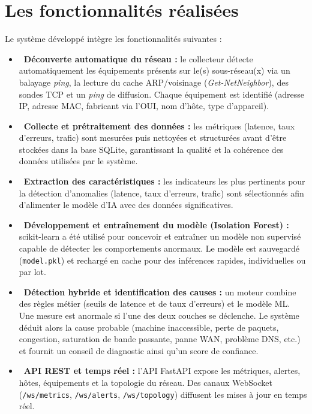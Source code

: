 \documentclass[12pt,a4paper]{report}
\newcommand{\checkitem}{\ding{51}}      %
\begin{document}
\section{Les fonctionnalités réalisées}
Le système développé intègre les fonctionnalités suivantes :

\begin{itemize}[leftmargin=*]
\item \textbf{\checkitem\ Découverte automatique du réseau :} le collecteur
détecte automatiquement les équipements présents sur le(s) sous-réseau(x) via un
balayage \textit{ping}, la lecture du cache ARP/voisinage
(\textit{Get-NetNeighbor}), des sondes TCP et un \textit{ping} de diffusion. Chaque
équipement est identifié (adresse IP, adresse MAC, fabricant via l'OUI, nom d'hôte,
type d'appareil).

\item \textbf{\checkitem\ Collecte et prétraitement des données :} les métriques
(latence, taux d'erreurs, trafic) sont mesurées puis nettoyées et structurées avant
d'être stockées dans la base SQLite, garantissant la qualité et la cohérence des
données utilisées par le système.

\item \textbf{\checkitem\ Extraction des caractéristiques :} les indicateurs les
plus pertinents pour la détection d'anomalies (latence, taux d'erreurs, trafic)
sont sélectionnés afin d'alimenter le modèle d'IA avec des données significatives.

\item \textbf{\checkitem\ Développement et entraînement du modèle
(Isolation Forest) :} scikit-learn a été utilisé pour concevoir et entraîner un
modèle non supervisé capable de détecter les comportements anormaux. Le modèle est
sauvegardé (\texttt{model.pkl}) et rechargé en cache pour des inférences rapides,
individuelles ou par lot.

\item \textbf{\checkitem\ Détection hybride et identification des causes :} un
moteur combine des règles métier (seuils de latence et de taux d'erreurs) et le
modèle ML. Une mesure est anormale si l'une des deux couches se déclenche. Le
système déduit alors la cause probable (machine inaccessible, perte de paquets,
congestion, saturation de bande passante, panne WAN, problème DNS, etc.) et fournit
un conseil de diagnostic ainsi qu'un score de confiance.

\item \textbf{\checkitem\ API REST et temps réel :} l'API FastAPI expose les
métriques, alertes, hôtes, équipements et la topologie du réseau. Des canaux
WebSocket (\texttt{/ws/metrics}, \texttt{/ws/alerts}, \texttt{/ws/topology})
diffusent les mises à jour en temps réel.


\end{itemize}
\end{document}
